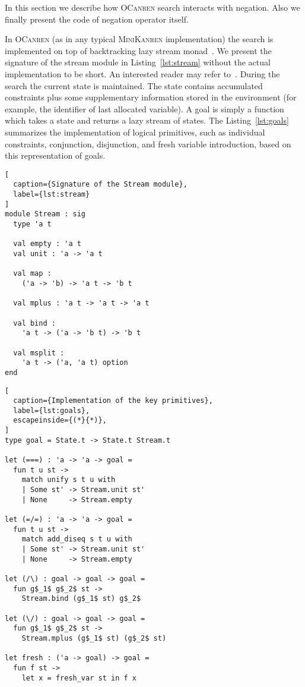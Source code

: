\label{sec:search}

In this section we describe how \textsc{OCanren} search interacts with negation.
Also we finally present the code of negation operator itself.

In \textsc{OCanren} (as in any typical \textsc{MiniKanren} implementation)
the search is implemented on top of 
backtracking lazy stream monad~\cite{kiselyov2005backtracking}.
We present the signature of the stream module in Listing~\ref{lst:stream} 
without the actual implementation to be short.
An interested reader may refer to~\cite{kiselyov2005backtracking, hemann2013mukanren}.
During the search the current state is maintained.
The state contains accumulated constraints plus
some supplementary information stored in the environment
(for example, the identifier of last allocated variable).
A goal is simply a function
which takes a state and returns a lazy stream of states.
The Listing~\ref{lst:goals} summarizes 
the implementation of logical primitives, 
such as individual constraints, conjunction, 
disjunction, and fresh variable introduction,
based on this representation of goals.

\begin{minipage}[t]{0.47\textwidth}
\begin{lstlisting}[
  caption={Signature of the Stream module},
  label={lst:stream}
]
module Stream : sig
  type 'a t

  val empty : 'a t
  val unit : 'a -> 'a t

  val map : 
    ('a -> 'b) -> 'a t -> 'b t

  val mplus : 'a t -> 'a t -> 'a t
  
  val bind : 
    'a t -> ('a -> 'b t) -> 'b t

  val msplit : 
    'a t -> ('a, 'a t) option
end
\end{lstlisting}
\end{minipage}\hfill
\begin{minipage}[t]{0.47\textwidth}
\begin{lstlisting}[
  caption={Implementation of the key primitives},
  label={lst:goals},
  escapeinside={(*}{*)},
]
type goal = State.t -> State.t Stream.t

let (===) : 'a -> 'a -> goal = 
  fun t u st ->
    match unify s t u with
    | Some st' -> Stream.unit st'
    | None     -> Stream.empty

let (=/=) : 'a -> 'a -> goal = 
  fun t u st ->
    match add_diseq s t u with
    | Some st' -> Stream.unit st'
    | None     -> Stream.empty

let (/\) : goal -> goal -> goal = 
  fun g$_1$ g$_2$ st ->
    Stream.bind (g$_1$ st) g$_2$

let (\/) : goal -> goal -> goal = 
  fun g$_1$ g$_2$ st ->
    Stream.mplus (g$_1$ st) (g$_2$ st)

let fresh : ('a -> goal) -> goal = 
  fun f st ->
    let x = fresh_var st in f x
\end{lstlisting}
\end{minipage}

